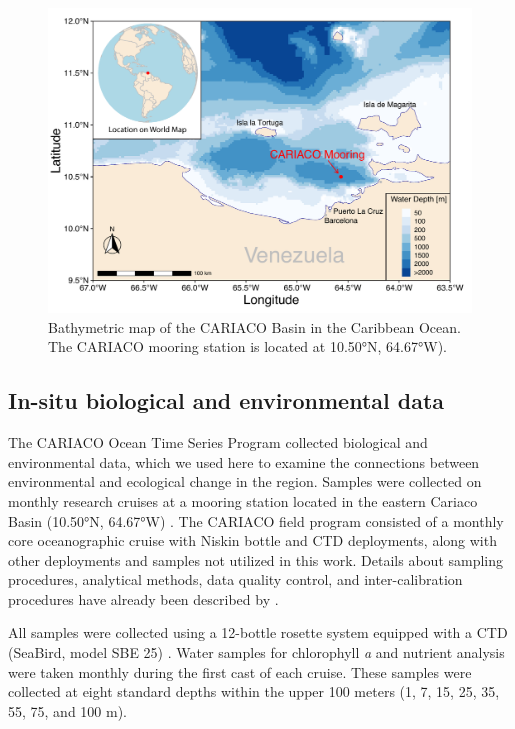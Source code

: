 \documentclass[draft]{agujournal2019}
\begin{document}
\begin{figure}
\noindent\includegraphics[width=\textwidth]{fig/Map_CAR.pdf}
\caption{Bathymetric map of the CARIACO Basin in the Caribbean Ocean. The CARIACO mooring station is located at \ang{10.50}N, \ang{64.67}W).}
\label{fig:map}
\end{figure}


\subsection{In-situ biological and environmental data}
    The CARIACO Ocean Time Series Program collected biological and environmental data, which we used here to examine the connections between environmental and ecological change in the region. Samples were collected on monthly research cruises at a mooring station located in the eastern Cariaco Basin (\ang{10.50}N, \ang{64.67}W) \cite{muller-karger_scientific_2019}.
    The CARIACO field program consisted of a monthly core oceanographic cruise with Niskin bottle and CTD deployments, along with other deployments and samples not utilized in this work. Details about sampling procedures, analytical methods, data quality control, and inter-calibration procedures have already been described by . 
    
    All samples were collected using a 12-bottle rosette system equipped with a CTD (SeaBird, model SBE 25) \cite{astor_yrene_m_handbook_2013}. Water samples for chlorophyll \textit{a} and nutrient analysis were taken monthly during the first cast of each cruise. These samples were collected at eight standard depths within the upper 100 meters (1, 7, 15, 25, 35, 55, 75, and 100 m). 
\end{document}
